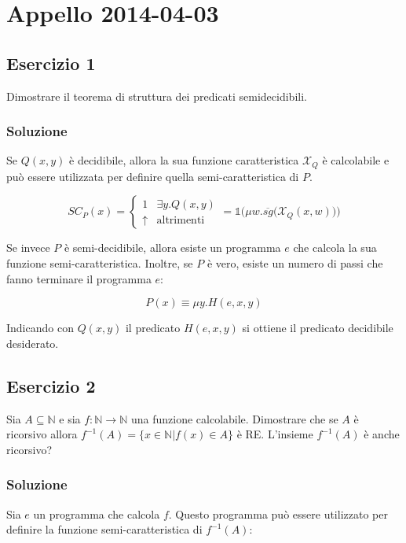 \section{Appello 2014-04-03}

\subsection{Esercizio 1}

Dimostrare il teorema di struttura dei predicati semidecidibili.

\subsubsection{Soluzione}

Se $Q(x,y)$ è decidibile, allora la sua funzione caratteristica $\mathcal{X}_Q$ è calcolabile e può essere utilizzata per definire quella semi-caratteristica di $P$.

$$
SC_P(x) = \begin{cases}
1  & \exists y . Q(x,y) \\
\uparrow &\text{altrimenti}
\end{cases} = \mathbb{1}\Bigg( \mu w. \overline{sg} \Big(\mathcal{X}_Q(x,w)  \Big)\Bigg)
$$

Se invece $P$ è semi-decidibile, allora esiste un programma $e$ che calcola la sua funzione semi-caratteristica. Inoltre, se $P$ è vero, esiste un numero di passi che fanno terminare il programma $e$:

$$
P(x) \equiv \mu y . H(e, x, y )
$$

Indicando con $Q(x,y)$ il predicato $H(e,x,y)$ si ottiene il predicato decidibile desiderato.


\subsection{Esercizio 2}

Sia $A \subseteq \mathbb{N}$ e sia $f : \mathbb{N} \rightarrow \mathbb{N}$ una funzione calcolabile. Dimostrare che se $A$ è ricorsivo allora $f^{-1}(A) = \{ x \in \mathbb{N} | f(x) \in A \}$ è RE. L'insieme $f^{-1}(A)$ è anche ricorsivo?

\subsubsection{Soluzione}

Sia $e$ un programma che calcola $f$. Questo programma può essere utilizzato per definire la funzione semi-caratteristica di $f^{-1}(A)$:

